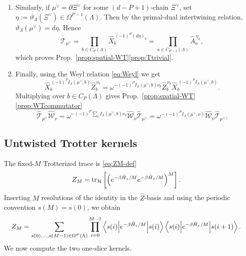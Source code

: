 \begin{enumerate}
	\item Similarly, if \(\mu^\vee=\partial\Xi^\vee\) for some
	\((d-P+1)\)-chain \(\Xi^\vee\), set $\eta:=\vartheta_\Lambda(\Xi^\vee)\in\Omega^{P-1}(\Lambda)$. Then
	by the primal-dual intertwining relation, $\vartheta_\Lambda(\mu^\vee)=d\eta$.
	Hence
	\begin{equation}
		\hat{\mathcal T}_{\mu^\vee}
		=
		\prod_{b\in C_P(\Lambda)}
		\hat X_b^{\,(-1)^P(d\eta)_b}
		=
		\prod_{a\in C_{P-1}(\Lambda)}
		\hat A_a^{\,\eta_a},
	\end{equation}
	which proves Prop.~\ref{prop:spatial-WT}\ref{prop:Ttrivial}.
	
	\item Finally, using the Weyl relation \eqref{eq:Weyl} we get
	\begin{equation}
		\hat X_b^{\,(-1)^P I_\Lambda(\mu^\vee,b)}
		\hat Z_b^{\,\nu_b}
		=
		\omega^{-(-1)^P I_\Lambda(\mu^\vee,b)\nu_b}
		\hat Z_b^{\,\nu_b}
		\hat X_b^{\,(-1)^P I_\Lambda(\mu^\vee,b)}.
	\end{equation}
	Multiplying over \(b\in C_P(\Lambda)\) gives Prop.~\ref{prop:spatial-WT}\ref{prop:WTcommutator}
	\begin{equation}
		\hat{\mathcal T}_{\mu^\vee}\hat{\mathcal W}_\nu
		=
		\omega^{-(-1)^P\sum_b I_\Lambda(\mu^\vee,b)\nu_b}
		\hat{\mathcal W}_\nu\hat{\mathcal T}_{\mu^\vee}
		=
		\omega^{-(-1)^P I_\Lambda(\mu^\vee,\nu)}
		\hat{\mathcal W}_\nu\hat{\mathcal T}_{\mu^\vee}.
	\end{equation}
\end{enumerate}



\subsection{Untwisted Trotter kernels}
\label{app:vanillaTr}

The fixed-\(M\) Trotterized trace is \eqref{eq:ZM-def}
\begin{equation}
	Z_M
	=
	\mathrm{tr}_{\mathcal H}
	\left[
	\left(
	e^{-\beta\hat H_z/M}e^{-\beta\hat H_x/M}
	\right)^M
	\right].
\end{equation}
Inserting \(M\) resolutions of the identity in the \(\hat Z\)-basis and using the
periodic convention \(s(M)=s(0)\), we obtain
\begin{equation}
	Z_M
	=
	\sum_{s(0),\dots,s(M-1)\in\Omega^P(\Lambda)}
	\prod_{i=0}^{M-1}
	\left\langle s(i) \middle| e^{-\beta\hat H_z/M} \middle| s(i) \right\rangle
	\left\langle s(i) \middle| e^{-\beta\hat H_x/M} \middle| s(i+1) \right\rangle.
	\label{eq:ZM-slices}
\end{equation}
We now compute the two one-slice kernels.

